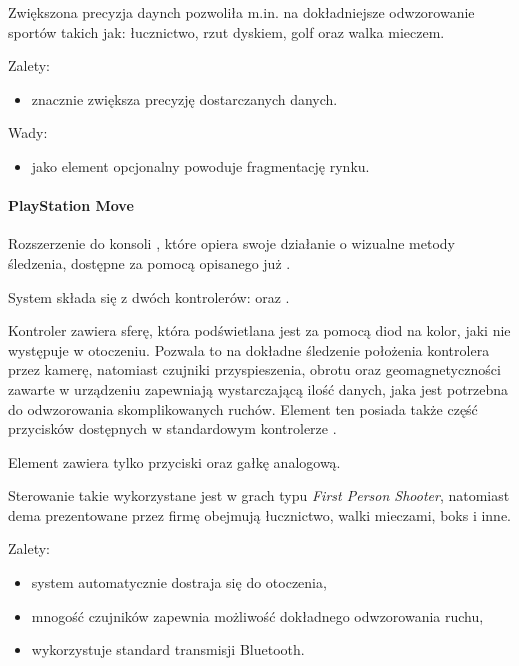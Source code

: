 Zwiększona precyzja daynch pozwoliła m.in. na dokładniejsze odwzorowanie sportów takich jak: łucznictwo, rzut dyskiem, golf oraz walka mieczem.

Zalety:
\begin{itemize}
  \item znacznie zwiększa precyzję dostarczanych danych.
\end{itemize}

Wady:
\begin{itemize}
  \item jako element opcjonalny powoduje fragmentację rynku.
\end{itemize}

\paragraph{PlayStation Move}
Rozszerzenie do konsoli , które opiera swoje działanie o wizualne metody śledzenia, dostępne za pomocą opisanego już .

System  składa się z dwóch kontrolerów:  oraz .

Kontroler  zawiera sferę, która podświetlana jest za pomocą diod na kolor, jaki nie występuje w otoczeniu. Pozwala to na dokładne śledzenie położenia kontrolera przez kamerę, natomiast czujniki przyspieszenia, obrotu oraz geomagnetyczności zawarte w urządzeniu zapewniają wystarczającą ilość danych, jaka jest potrzebna do odwzorowania skomplikowanych ruchów. Element ten posiada także część przycisków dostępnych w standardowym kontrolerze .

Element  zawiera tylko przyciski oraz gałkę analogową.

Sterowanie takie wykorzystane jest w grach typu \textsl{First Person Shooter}, natomiast dema prezentowane przez firmę  obejmują łucznictwo, walki mieczami, boks i inne.

Zalety:
\begin{itemize}
  \item system automatycznie dostraja się do otoczenia,
  \item mnogość czujników zapewnia możliwość dokładnego odwzorowania ruchu,
  \item wykorzystuje standard transmisji Bluetooth.
\end{itemize}

